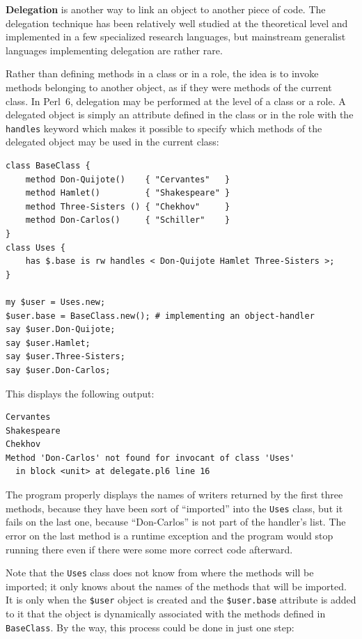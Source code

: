 {\bf Delegation} is another way to link an object to another piece 
of code. The delegation technique has been relatively well 
studied at the theoretical level and implemented in a few 
specialized research languages, but mainstream generalist 
languages implementing delegation are rather rare.

Rather than defining methods in a class or in a role, the 
idea is to invoke methods belonging to another object, as 
if they were methods of the current class. In Perl~6, delegation 
may be performed at the level of a class or a role. A delegated 
object is simply an attribute defined in the class or in the role 
with the {\tt handles} keyword which makes it possible to specify 
which methods of the delegated object may be used in the 
current class:

  
   
  
\begin{verbatim}
class BaseClass {
    method Don-Quijote()    { "Cervantes"   }
    method Hamlet()         { "Shakespeare" }
    method Three-Sisters () { "Chekhov"     }
    method Don-Carlos()     { "Schiller"    }
}
class Uses { 
    has $.base is rw handles < Don-Quijote Hamlet Three-Sisters >;
}

my $user = Uses.new;
$user.base = BaseClass.new(); # implementing an object-handler
say $user.Don-Quijote;
say $user.Hamlet;
say $user.Three-Sisters;
say $user.Don-Carlos;
\end{verbatim}

This displays the following output:

\begin{verbatim}
Cervantes
Shakespeare
Chekhov
Method 'Don-Carlos' not found for invocant of class 'Uses'
  in block <unit> at delegate.pl6 line 16
\end{verbatim}

The program properly displays the names of writers returned 
by the first three methods, because they have been sort of 
``imported'' into the {\tt Uses} class, but it fails on the 
last one, because ``Don-Carlos'' is not part of the handler's 
list. The error on the last method is a runtime exception 
and the program would stop running there even if there 
were some more correct code afterward. 

Note that the {\tt Uses} class does not know from where the 
methods will be imported; it only knows about the names of 
the methods that will be imported. It is only when the 
\verb'$user' object is created and the \verb'$user.base' 
attribute is added to it that the object is dynamically 
associated with the methods defined in {\tt BaseClass}. 
By the way, this process could be done in just one step:

